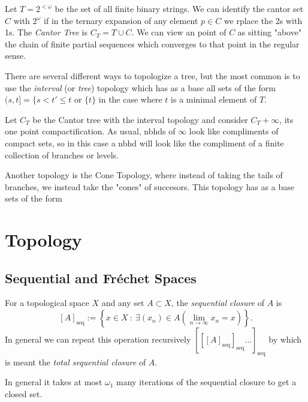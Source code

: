 \documentclass{article}
\newcommand{\seqcl}[1]{{[#1]_{\text{seq}}}}
\begin{document}
\begin{exam}
    Let \(T = 2^{< \omega}\) be the set of all finite binary strings. We can identify the cantor set \(C\) with \(2^{\omega}\) if in the ternary expansion of any element \(p \in C\) we rplace the 2s with 1s. The \textit{Cantor Tree} is \(C_T = T \cup C\). We can view an point of \(C\) as sitting "above" the chain of finite partial sequences which converges to that point in the regular sense. 
\end{exam}
There are several different ways to topologize a tree, but the most common is to use the \textit{interval} (or \textit{tree}) topology which has as a base all sets of the form \((s, t] = \{s < t' \leq t\) or \(\{t\}\) in the case where \(t\) is a minimal element of \(T\).

\begin{exam}
    Let \(C_T\) be the Cantor tree with the interval topology and consider \(C_T + \infty\), its one point compactification. As usual, nbhds of \(\infty\) look like compliments of compact sets, so in this case a nbhd will look like the compliment of a finite collection of branches or levels. 
\end{exam}
 Another topology is the Cone Topology, where instead  of taking the tails of branches, we instead take the "cones" of succesors. This topology has as a base sets of the form

\newpage
\section{Topology}
\subsection{Sequential and Fréchet Spaces}

\begin{defn}
    For a topological space \(X\) and any set \(A \subset X\), the \textit{sequential closure} of \(A\) is  
    \[
        \seqcl{A} := \left\{x \in X \: : \: \exists (x_n) \in A \left(\lim_{n\to \infty} x_n = x\right) \right\}.
    \]
    In general we can repeat this operation recursively \(\seqcl{\seqcl{\seqcl{A}}\dots}\) by which is meant the \textit{total sequential closure} of \(A\).
    
\end{defn}

\begin{fact}
    In general it takes at most \(\omega_1\) many iterations of the sequential closure to get a closed set. 
\end{fact}
\end{document}
